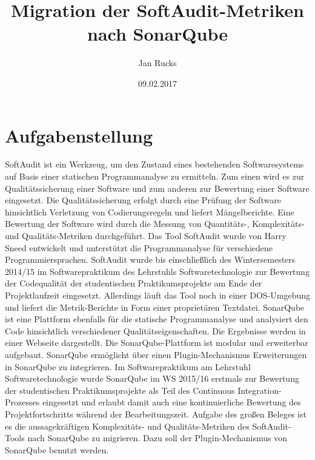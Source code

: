 \documentclass[gb,ngerman]{stthesis}
\title{Migration der SoftAudit-Metriken \newline nach SonarQube}
\author{Jan Rucks}
\date{09.02.2017}
\begin{document}
	\maketitle 
	\chapter*{Aufgabenstellung}
		SoftAudit ist ein Werkzeug, um den Zustand eines bestehenden Softwaresystems auf Basis einer statischen Programmanalyse zu ermitteln. Zum einen wird es zur Qualitätssicherung einer Software und zum anderen zur Bewertung einer Software eingesetzt. Die Qualitätssicherung erfolgt durch eine Prüfung der Software hinsichtlich Verletzung von Codierungsregeln und liefert Mängelberichte. Eine Bewertung der Software wird durch die Messung von Quantitäts-, Komplexitäts- und Qualitäts-Metriken durchgeführt. Das Tool SoftAudit wurde von Harry Sneed entwickelt und unterstützt die Programmanalyse für verschiedene Programmiersprachen. SoftAudit wurde bis einschließlich des Wintersemesters 2014/15 im Softwarepraktikum des Lehrstuhls Softwaretechnologie zur Bewertung der Codequalität der studentischen Praktikumsprojekte am Ende der Projektlaufzeit eingesetzt. Allerdings läuft das Tool noch in einer DOS-Umgebung und liefert die Metrik-Berichte in Form einer proprietären Textdatei. \newline
		SonarQube ist eine Plattform ebenfalls für die statische Programmanalyse und analysiert den Code hinsichtlich verschiedener Qualitätseigenschaften. Die Ergebnisse werden in einer Webseite dargestellt. Die SonarQube-Plattform ist modular und erweiterbar aufgebaut. SonarQube ermöglicht über einen Plugin-Mechanismus Erweiterungen in SonarQube zu integrieren. Im Softwarepraktikum am Lehrstuhl Softwaretechnologie wurde SonarQube im WS 2015/16 erstmals zur Bewertung der studentischen Praktikumsprojekte als Teil des Continuous Integration-Prozesses eingesetzt und erlaubt damit auch eine kontinuierliche Bewertung des Projektfortschritts während der Bearbeitungszeit. \newline
		Aufgabe des großen Beleges ist es die aussagekräftigen Komplexitäts- und Qualitäts-Metriken des SoftAudit-Tools nach SonarQube zu migrieren. Dazu soll der Plugin-Mechanismus von SonarQube benutzt werden. \newline
		
\end{document}
